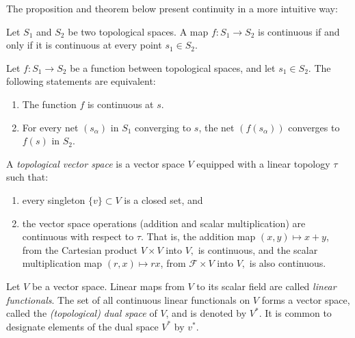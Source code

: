 The proposition and theorem below present continuity in a more intuitive way:
\begin{proposition} \cite[Theorem 2.27]{guide2006infinite}
  Let \( S_1 \) and \( S_2 \) be two topological spaces. A map \( f : S_1 \to S_2 \) is continuous if and only if it is continuous at every point \( s_1 \in S_2 \).
\end{proposition}

\begin{theorem} \cite[Theorem 2.28]{guide2006infinite} \label{def:continuidade_top}
  Let $f \colon S_1 \to S_2$ be a function between topological spaces, and let $s_1 \in S_2$. The following statements are equivalent:
\begin{enumerate}
    \item The function $f$ is continuous at $s$.
    \item For every net $(s_\alpha)$ in $S_1$ converging to $s$, the net $(f(s_\alpha))$ converges to $f(s)$ in $S_2$.
\end{enumerate}
\end{theorem}




\begin{definition}
A \emph{topological vector space} is a vector space \( V \) equipped with a linear topology \( \tau \) such that:
\begin{enumerate}
    \item every singleton \( \{v\} \subset V \) is a closed set, and
    \item the vector space operations (addition and scalar multiplication) are continuous with respect to \( \tau \).  That is, the addition map \( (x, y) \mapsto x + y \), from the Cartesian product \( V \times V \) into \( V, \) is continuous, and the scalar multiplication map \( (r, x) \mapsto r x \), from \( \mathcal{F} \times V \) into \( V, \) is also continuous.
\end{enumerate}

\end{definition}

\begin{definition}
  Let $V$ be a vector space. 
  Linear maps from $V$ to its scalar field are called \emph{linear functionals}. The set of all continuous linear functionals on $V$ forms a vector space, called the \emph{(topological) dual space} of $ V $, and is denoted by  $V^*$. It is common to designate elements of the dual space  $V^*$  by \( v^* \).  %
\end{definition}

